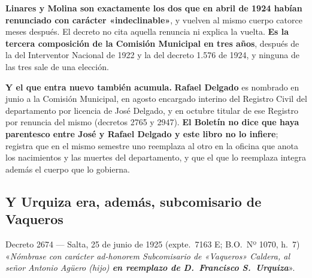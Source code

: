 \begin{cautela}
\textbf{Linares y Molina son exactamente los dos que en abril de 1924 habían renunciado con
carácter «indeclinable»}, y vuelven al mismo cuerpo catorce meses después. El decreto no cita
aquella renuncia ni explica la vuelta. \textbf{Es la tercera composición de la Comisión Municipal
en tres años}, después de la del Interventor Nacional de 1922 y la del decreto 1.576 de 1924, y
ninguna de las tres sale de una elección.

\textbf{Y el que entra nuevo también acumula.} \textbf{Rafael Delgado} es nombrado en junio a la
Comisión Municipal, en agosto encargado interino del Registro Civil del departamento por licencia
de José Delgado, y en octubre titular de ese Registro por renuncia del mismo (decretos 2765 y
2947). \textbf{El Boletín no dice que haya parentesco entre José y Rafael Delgado y este libro no
lo infiere}; registra que en el mismo semestre uno reemplaza al otro en la oficina que anota los
nacimientos y las muertes del departamento, y que el que lo reemplaza integra además el cuerpo
que lo gobierna.
\end{cautela}

\subsection*{Y Urquiza era, además, subcomisario de Vaqueros}

\begin{ficha}{Decreto 2674 --- Salta, 25 de junio de 1925 (expte.\ 7163 E; B.O.\ Nº 1070, h.\ 7)}
«\textit{Nómbrase con carácter ad-honorem Subcomisario de «Vaqueros» Caldera, al señor Antonio
Agüero (hijo) \textbf{en reemplazo de D.\ Francisco S.\ Urquiza}}».
\end{ficha}

